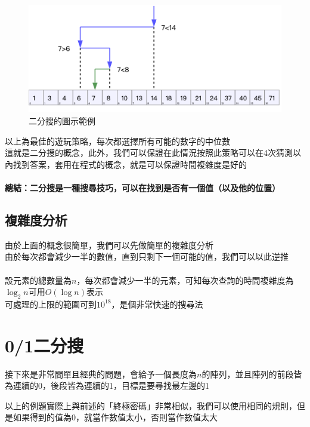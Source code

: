 \documentclass[12pt]{article}
\begin{document}
    \begin{figure}[h]
        \centering
        \includegraphics{binary_search_example.png}
        \caption{二分搜的圖示範例}
    \end{figure}

    \noindent
    以上為最佳的遊玩策略，每次都選擇所有可能的數字的中位數\\
    這就是二分搜的概念，此外，我們可以保證在此情況按照此策略可以在4次猜測以內找到答案，套用在程式的概念，就是可以保證時間複雜度是好的\\\\
    \noindent\textbf{總結：二分搜是一種搜尋技巧，可以在找到是否有一個值（以及他的位置）}

    \subsection{複雜度分析}
    由於上面的概念很簡單，我們可以先做簡單的複雜度分析\\
    由於每次都會減少一半的數值，直到只剩下一個可能的值，我們可以以此逆推\\\\

    設元素的總數量為$n$，每次都會減少一半的元素，可知每次查詢的時間複雜度為$\log_2{n}$可用$O(\log{n})$表示\\
    可處理的上限的範圍可到$10^{18}$，是個非常快速的搜尋法
    \pagebreak

    \section{0/1二分搜}
    接下來是非常間單且經典的問題，會給予一個長度為$n$的陣列，並且陣列的前段皆為連續的0，後段皆為連續的1，目標是要尋找最左邊的1
    

    \noindent
    以上的例題實際上與前述的「終極密碼」非常相似，我們可以使用相同的規則，但是如果得到的值為0，就當作數值太小，否則當作數值太大
    
\end{document}
